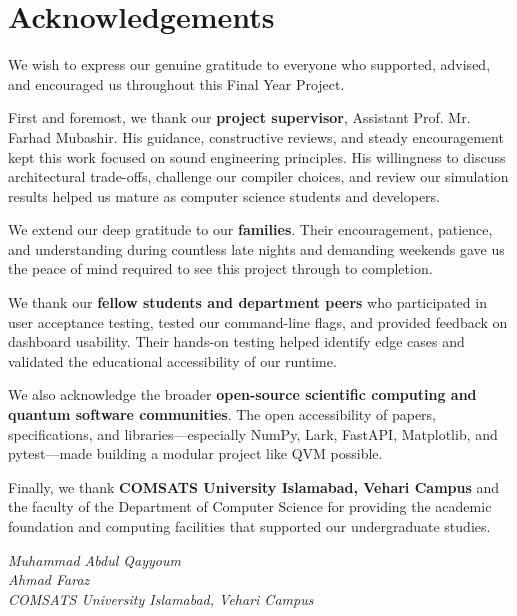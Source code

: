 
\chapter*{Acknowledgements}

We wish to express our genuine gratitude to everyone who supported, advised, and encouraged us throughout this Final Year Project.

First and foremost, we thank our \textbf{project supervisor}, Assistant Prof. Mr. Farhad Mubashir. His guidance, constructive reviews, and steady encouragement kept this work focused on sound engineering principles. His willingness to discuss architectural trade-offs, challenge our compiler choices, and review our simulation results helped us mature as computer science students and developers.

We extend our deep gratitude to our \textbf{families}. Their encouragement, patience, and understanding during countless late nights and demanding weekends gave us the peace of mind required to see this project through to completion.

We thank our \textbf{fellow students and department peers} who participated in user acceptance testing, tested our command-line flags, and provided feedback on dashboard usability. Their hands-on testing helped identify edge cases and validated the educational accessibility of our runtime.

We also acknowledge the broader \textbf{open-source scientific computing and quantum software communities}. The open accessibility of papers, specifications, and libraries—especially NumPy, Lark, FastAPI, Matplotlib, and pytest—made building a modular project like QVM possible.

Finally, we thank \textbf{COMSATS University Islamabad, Vehari Campus} and the faculty of the Department of Computer Science for providing the academic foundation and computing facilities that supported our undergraduate studies.

\vspace{1.2cm}

\begin{flushright}
\textit{Muhammad Abdul Qayyoum}\\
\textit{Ahmad Faraz}\\
\textit{COMSATS University Islamabad, Vehari Campus}
\end{flushright}
